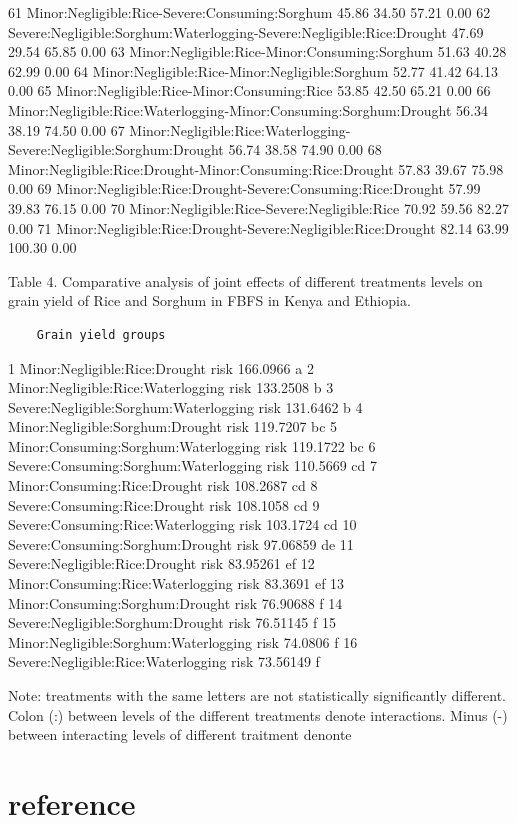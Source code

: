 \documentclass[12pt,oneside]{article}
\begin{document}
61 Minor:Negligible:Rice-Severe:Consuming:Sorghum 45.86 34.50 57.21 0.00
62 Severe:Negligible:Sorghum:Waterlogging-Severe:Negligible:Rice:Drought 47.69 29.54 65.85 0.00
63 Minor:Negligible:Rice-Minor:Consuming:Sorghum 51.63 40.28 62.99 0.00
64 Minor:Negligible:Rice-Minor:Negligible:Sorghum 52.77 41.42 64.13 0.00
65 Minor:Negligible:Rice-Minor:Consuming:Rice 53.85 42.50 65.21 0.00
66 Minor:Negligible:Rice:Waterlogging-Minor:Consuming:Sorghum:Drought 56.34 38.19 74.50 0.00
67 Minor:Negligible:Rice:Waterlogging-Severe:Negligible:Sorghum:Drought 56.74 38.58 74.90 0.00
68 Minor:Negligible:Rice:Drought-Minor:Consuming:Rice:Drought 57.83 39.67 75.98 0.00
69 Minor:Negligible:Rice:Drought-Severe:Consuming:Rice:Drought 57.99 39.83 76.15 0.00
70 Minor:Negligible:Rice-Severe:Negligible:Rice 70.92 59.56 82.27 0.00
71 Minor:Negligible:Rice:Drought-Severe:Negligible:Rice:Drought 82.14 63.99 100.30 0.00

Table 4. Comparative analysis of joint effects of different treatments levels on grain yield of Rice and Sorghum in FBFS in Kenya and Ethiopia.

\begin{verbatim}
    Grain yield groups
\end{verbatim}

1 Minor:Negligible:Rice:Drought risk 166.0966 a
2 Minor:Negligible:Rice:Waterlogging risk 133.2508 b
3 Severe:Negligible:Sorghum:Waterlogging risk 131.6462 b
4 Minor:Negligible:Sorghum:Drought risk 119.7207 bc
5 Minor:Consuming:Sorghum:Waterlogging risk 119.1722 bc
6 Severe:Consuming:Sorghum:Waterlogging risk 110.5669 cd
7 Minor:Consuming:Rice:Drought risk 108.2687 cd
8 Severe:Consuming:Rice:Drought risk 108.1058 cd
9 Severe:Consuming:Rice:Waterlogging risk 103.1724 cd
10 Severe:Consuming:Sorghum:Drought risk 97.06859 de
11 Severe:Negligible:Rice:Drought risk 83.95261 ef
12 Minor:Consuming:Rice:Waterlogging risk 83.3691 ef
13 Minor:Consuming:Sorghum:Drought risk 76.90688 f
14 Severe:Negligible:Sorghum:Drought risk 76.51145 f
15 Minor:Negligible:Sorghum:Waterlogging risk 74.0806 f
16 Severe:Negligible:Rice:Waterlogging risk 73.56149 f

Note: treatments with the same letters are not statistically significantly different. Colon (:) between levels of the different treatments denote interactions. Minus (-) between interacting levels of different traitment denonte

\hypertarget{VI}{%
\section{reference}\label{VI}}
\end{document}
